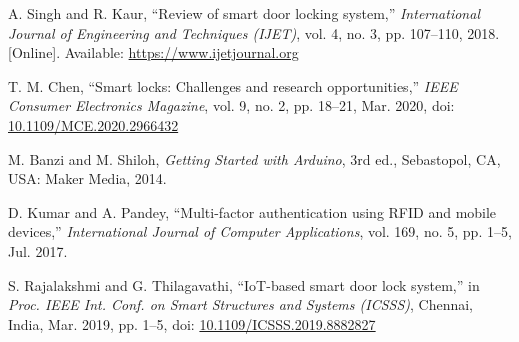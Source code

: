 \documentclass[conference, onecolumn]{IEEEtran}
\begin{document}
\begin{thebibliography}{99}
	
	A. Singh and R. Kaur, ``Review of smart door locking system,'' \textit{International Journal of Engineering and Techniques (IJET)}, vol. 4, no. 3, pp. 107--110, 2018. [Online]. Available: \url{https://www.ijetjournal.org}
	
	T. M. Chen, ``Smart locks: Challenges and research opportunities,'' \textit{IEEE Consumer Electronics Magazine}, vol. 9, no. 2, pp. 18--21, Mar. 2020, doi: \href{https://doi.org/10.1109/MCE.2020.2966432}{10.1109/MCE.2020.2966432}
	
	M. Banzi and M. Shiloh, \textit{Getting Started with Arduino}, 3rd ed., Sebastopol, CA, USA: Maker Media, 2014.
	
	D. Kumar and A. Pandey, ``Multi-factor authentication using RFID and mobile devices,'' \textit{International Journal of Computer Applications}, vol. 169, no. 5, pp. 1--5, Jul. 2017.
	
	S. Rajalakshmi and G. Thilagavathi, ``IoT-based smart door lock system,'' in \textit{Proc. IEEE Int. Conf. on Smart Structures and Systems (ICSSS)}, Chennai, India, Mar. 2019, pp. 1--5, doi: \href{https://doi.org/10.1109/ICSSS.2019.8882827}{10.1109/ICSSS.2019.8882827}
	
\end{thebibliography}


\end{document}
